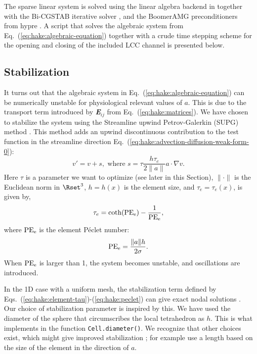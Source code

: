 The sparse linear system is solved using the \petsc linear algebra
backend \citep{BalayBuschelmanGroppEtAl2001} in \pydolfin together with
the Bi-CGSTAB iterative solver \citep{Vorst1992}, and the BoomerAMG
preconditioners from hypre \citep{FalgoutYang2002}. A script that
solves the algebraic system from
Eq.~(\ref{eq:hake:algebraic-equation}) together with a crude time
stepping scheme for the opening and closing of the included LCC
channel is presented below.

\subsection{Stabilization}
\label{sec:hake:stabilization}

It turns out that the algebraic system in
Eq.~(\ref{eq:hake:algebraic-equation}) can be numerically unstable for
physiological relevant values of $a$. This is due to the transport
term introduced by {\bfseries\itshape E}$_{ij}$ from
Eq.~(\ref{eq:hake:matrices}). We have chosen to stabilize the system
using the Streamline upwind Petrov-Galerkin (SUPG) method
\citep{BrooksHughes1982}. This method adds an upwind discontinuous
contribution to the test function in the streamline direction
Eq.~(\ref{eq:hake:advection-diffusion-weak-form-0}):
\begin{equation}
  \label{eq:hake:stabilizing-term}
  v' = v+s, \text{ where } s = \tau\frac{h\tau_e}{2\|a\|}a\cdot\nabla v.
\end{equation}
Here $\tau$ is a parameter we want to optimize (see later in this
Section), $\|\cdot\|$ is the Euclidean norm in $\Rset^3$, $h=h(x)$ is
the element size, and $\tau_e=\tau_e(x)$, is given by,
\begin{equation}
  \label{eq:hake:element-tau}
  \tau_e=\coth(\mathrm{PE}_{\mathrm{e}})-\frac{1}{\mathrm{PE}_{\mathrm{e}}},
\end{equation}
where $\mathrm{PE}_{\mathrm{e}}$ is the element P\'eclet number:
\begin{equation}
  \label{eq:hake:peclet}
  \mathrm{PE}_{\mathrm{e}} = \frac{\|a\|h}{2\sigma}.
\end{equation}
When $\mathrm{PE}_{\mathrm{e}}$ is larger than 1, the system becomes unstable, and
oscillations are introduced.

In the 1D case with a uniform mesh, the stabilization term defined by
Eqs.~(\ref{eq:hake:element-tau})-(\ref{eq:hake:peclet}) can give exact
nodal solutions
\citep{ChristieGriffithsMitchellEtAl1976,BrooksHughes1982}. Our choice
of stabilization parameter is inspired by this. We have used the
diameter of the sphere that circumscribes the local tetrahedron as
$h$. This is what \dolfin implements in the function
\texttt{Cell.diameter()}. We recognize that other choices exist, which
might give improved stabilization \citep{JohnKnobloch2007}; for example
\citet{TezduyarPark1986} use a length based on the size of the element
in the direction of $a$.

